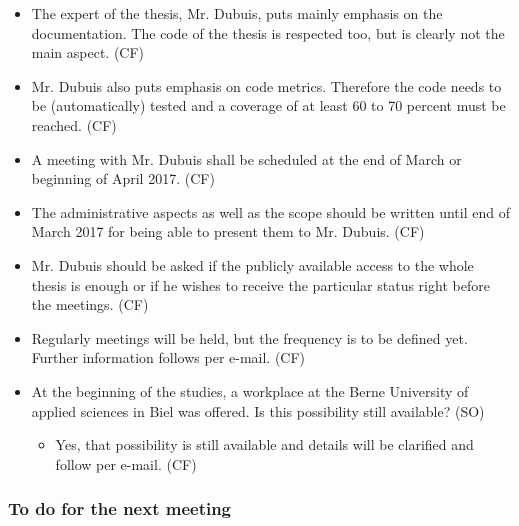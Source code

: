 \documentclass[10pt, openright, notitlepage]{scrreprt}
\begin{document}
\begin{itemize}
\item The expert of the thesis, Mr. Dubuis, puts mainly emphasis on the
documentation. The code of the thesis is respected too, but is clearly not the
main aspect. (CF)
\item Mr. Dubuis also puts emphasis on code metrics. Therefore the code needs to be
(automatically) tested and a coverage of at least 60 to 70 percent must be
reached. (CF)
\item A meeting with Mr. Dubuis shall be scheduled at the end of March or beginning
of April 2017. (CF)
\item The administrative aspects as well as the scope should be written until end of
March 2017 for being able to present them to Mr. Dubuis. (CF)
\item Mr. Dubuis should be asked if the publicly available access to the whole
thesis is enough or if he wishes to receive the particular status right before
the meetings. (CF)
\item Regularly meetings will be held, but the frequency is to be defined yet.
Further information follows per e-mail. (CF)
\item At the beginning of the studies, a workplace at the Berne University of
applied sciences in Biel was offered. Is this possibility still available?
(SO)
\begin{itemize}
\item Yes, that possibility is still available and details will be clarified and
follow per e-mail. (CF)
\end{itemize}
\end{itemize}

\subsubsection{To do for the next meeting}
\label{sec:org5ea46aa}
\end{document}
